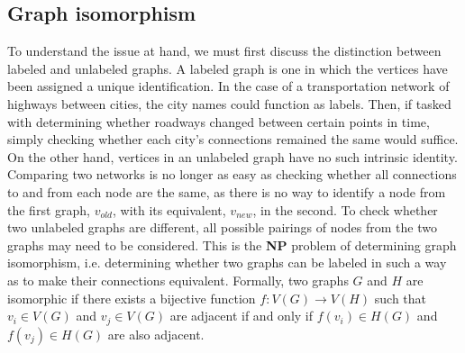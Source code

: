 \documentclass[11pt]{article}
\begin{document}
\subsection{Graph isomorphism}
\indent To understand the issue at hand, we must first discuss the distinction between labeled and unlabeled graphs. A labeled graph is one in which the vertices have been assigned a unique identification. In the case of a transportation network of highways between cities, the city names could function as labels. Then, if tasked with determining whether roadways changed between certain points in time, simply checking whether each city's connections remained the same would suffice. On the other hand, vertices in an unlabeled graph have no such intrinsic identity. Comparing two networks is no longer as easy as checking whether all connections to and from each node are the same, as there is no way to identify a node from the first graph, $v_{old}$, with its equivalent, $v_{new}$, in the second. To check whether two unlabeled graphs are different, all possible pairings of nodes from the two graphs may need to be considered. This is the \textbf{NP} problem of determining graph isomorphism, i.e. determining whether two graphs can be labeled in such a way as to make their connections equivalent. Formally, two graphs $G$ and $H$ are isomorphic if there exists a bijective function $f:V(G) \rightarrow V(H)$ such that $v_{i} \in V(G)$ and $v_{j} \in V(G)$ are adjacent if and only if $f(v_{i}) \in H(G)$ and $f(v_{j}) \in H(G)$ are also adjacent. \vspace{1mm}
\end{document}
